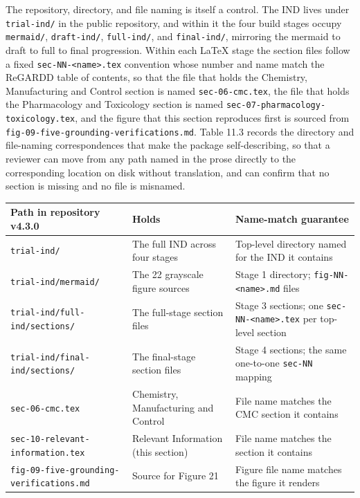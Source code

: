The repository, directory, and file naming is itself a control. The IND lives under
\texttt{trial-ind/} in the public repository, and within it the four build stages
occupy \texttt{mermaid/}, \texttt{draft-ind/}, \texttt{full-ind/}, and
\texttt{final-ind/}, mirroring the mermaid to draft to full to final progression.
Within each LaTeX stage the section files follow a fixed
\texttt{sec-NN-<name>.tex} convention whose number and name match the ReGARDD table
of contents, so that the file that holds the Chemistry, Manufacturing and Control
section is named \texttt{sec-06-cmc.tex}, the file that holds the Pharmacology and
Toxicology section is named \texttt{sec-07-pharmacology-toxicology.tex}, and the
figure that this section reproduces first is sourced from
\texttt{fig-09-five-grounding-verifications.md}. Table 11.3 records the directory
and file-naming correspondences that make the package self-describing, so that a
reviewer can move from any path named in the prose directly to the corresponding
location on disk without translation, and can confirm that no section is missing
and no file is misnamed.

\noindent\begin{tabularx}{\textwidth}{L{4.6cm} L{4.0cm} Y}
\toprule
\textbf{Path in repository v4.3.0} & \textbf{Holds} & \textbf{Name-match guarantee} \\
\midrule
\texttt{trial-ind/} & The full IND across four stages & Top-level directory named for the IND it contains \\
\texttt{trial-ind/mermaid/} & The 22 grayscale figure sources & Stage 1 directory; \texttt{fig-NN-<name>.md} files \\
\texttt{trial-ind/full-ind/sections/} & The full-stage section files & Stage 3 sections; one \texttt{sec-NN-<name>.tex} per top-level section \\
\texttt{trial-ind/final-ind/sections/} & The final-stage section files & Stage 4 sections; the same one-to-one \texttt{sec-NN} mapping \\
\texttt{sec-06-cmc.tex} & Chemistry, Manufacturing and Control & File name matches the CMC section it contains \\
\texttt{sec-10-relevant-information.tex} & Relevant Information (this section) & File name matches the section it contains \\
\texttt{fig-09-five-grounding-verifications.md} & Source for Figure 21 & Figure file name matches the figure it renders \\
\bottomrule
\end{tabularx}

